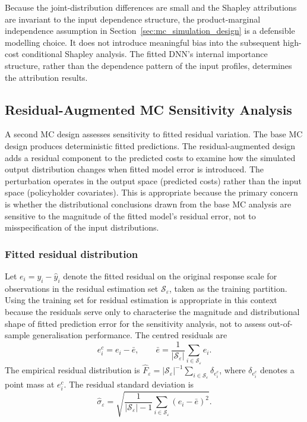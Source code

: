 Because the joint-distribution differences are small and the Shapley
attributions are invariant to the input dependence structure, the
product-marginal independence assumption in
Section~\ref{sec:mc_simulation_design} is a defensible modelling choice. It
does not introduce meaningful bias into the subsequent high-cost conditional
Shapley analysis. The fitted DNN's internal importance structure,
rather than the dependence pattern of the input profiles, determines the
attribution results.

\subsection{Residual-Augmented MC Sensitivity Analysis}
\label{sec:residual_augmented_mc}

A second MC design assesses sensitivity to fitted residual
variation. The base MC design produces deterministic fitted
predictions. The residual-augmented design adds a residual component to the
predicted costs to examine how the simulated output distribution changes
when fitted model error is introduced. The perturbation operates in the
output space (predicted costs) rather than the input space (policyholder
covariates). This is appropriate because the primary concern is whether the
distributional conclusions drawn from the base MC analysis are
sensitive to the magnitude of the fitted model's residual error, not to
misspecification of the input distributions.

\subsubsection{Fitted residual distribution}

Let $e_i = y_i - \widehat{y}_i$ denote the fitted residual on the original
response scale for observations in the residual estimation set
$\mathcal{S}_{\varepsilon}$, taken as the training partition. Using the
training set for residual estimation is appropriate in this context because
the residuals serve only to characterise the magnitude and distributional
shape of fitted prediction error for the sensitivity analysis, not to assess
out-of-sample generalisation performance. The centred
residuals are
\begin{equation}
    e_i^{c}
    =
    e_i - \bar{e},
    \qquad
    \bar{e}
    =
    \frac{1}{|\mathcal{S}_{\varepsilon}|}
    \sum_{i \in \mathcal{S}_{\varepsilon}}
    e_i.
    \label{eq:centered_residuals_ch3}
\end{equation}
The empirical residual distribution is
$\widehat{F}_{\varepsilon}
=
|\mathcal{S}_{\varepsilon}|^{-1}
\sum_{i \in \mathcal{S}_{\varepsilon}}
\delta_{e_i^{c}}$,
where $\delta_{e_i^{c}}$ denotes a point mass at $e_i^{c}$. The residual
standard deviation is
\begin{equation}
    \widehat{\sigma}_{\varepsilon}
    =
    \sqrt{
    \frac{1}{|\mathcal{S}_{\varepsilon}|-1}
    \sum_{i \in \mathcal{S}_{\varepsilon}}
    \left(
        e_i - \bar{e}
    \right)^2
    }.
    \label{eq:residual_sd_ch3}
\end{equation}

